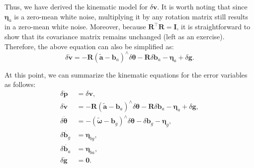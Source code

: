 Thus, we have derived the kinematic model for $\delta \bm{v}$. It is worth noting that since $\boldsymbol{\eta}_a$ is a zero-mean white noise, multiplying it by any rotation matrix still results in a zero-mean white noise. Moreover, because $\bm{R}^\top \bm{R} = \bm{I}$, it is straightforward to show that its covariance matrix remains unchanged (left as an exercise). Therefore, the above equation can also be simplified as:
\begin{equation}\label{key}
	\delta \dot{\bm{v}} = - \bm{R}(\tilde{\bm{a}} - \bm{b}_a)^\wedge \delta \boldsymbol{\theta} - 
	\bm{R} \delta \bm{b}_a  - \boldsymbol{\eta}_a + \delta \bm{g}.
\end{equation}

At this point, we can summarize the kinematic equations for the error variables as follows:
\begin{subequations}\label{eq:eskf-error-state-continuous-time}
	\begin{align}
		\delta \dot{\bm{p}} &= \delta \bm{v}, \\
		\delta \dot{\bm{v}} &= - \bm{R}(\tilde{\bm{a}} - \bm{b}_a)^\wedge \delta \boldsymbol{\theta} - 
		\bm{R} \delta \bm{b}_a  - \boldsymbol{\eta}_a + \delta \bm{g}, \\
		\delta \dot{\boldsymbol{\theta}} &= -(\tilde{\boldsymbol{\omega}} - \bm{b}_g)^\wedge \delta 
		\boldsymbol{\theta} - \delta \bm{b}_g - \boldsymbol{\eta}_g, \\
		\delta \dot{\bm{b}_g} &= \boldsymbol{\eta}_{bg}, \\
		\delta \dot{\bm{b}_a} &= \boldsymbol{\eta}_{ba}, \\
		\delta \dot{\bm{g}} &= \bm{0} .
	\end{align}
\end{subequations}
